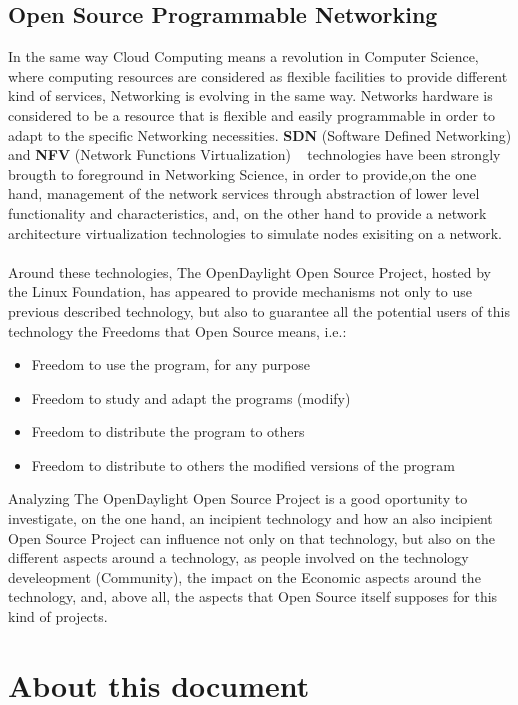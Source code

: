 \documentclass[a4paper, 12pt]{book}
\begin{document}
\subsection{Open Source Programmable Networking}
\label{subsec:freesoftware}
In the same way Cloud Computing means a revolution in Computer Science, where computing resources are considered as flexible facilities to provide different kind of services, Networking is evolving in the same way. Networks hardware is considered to be a resource that is flexible and easily programmable in order to adapt to the specific Networking necessities. \textbf{SDN} (Software Defined Networking) and \textbf{NFV} (Network Functions Virtualization) ~\cite{SDN} technologies have been strongly brougth to foreground in Networking Science, in order to provide,on the one hand, management of the network services through abstraction of lower level functionality and characteristics, and, on the other hand to provide a network architecture virtualization technologies to simulate nodes exisiting on a network.\\
\\
Around these technologies, The OpenDaylight Open Source Project, hosted by the Linux Foundation, has appeared to provide mechanisms not only to use previous described technology, but also to guarantee all the potential users of this technology the Freedoms that Open Source means, i.e.:
\begin{itemize}
 \item Freedom to use the program, for any purpose
 \item Freedom to study and adapt the programs (modify)
 \item Freedom to distribute the program to others
 \item Freedom to distribute to others the modified versions of the program
\end{itemize}
Analyzing The OpenDaylight Open Source Project is a good oportunity to investigate, on the one hand, an incipient technology and how an also incipient Open Source Project can influence not only on that technology, but also on the different aspects around a technology, as people involved on the technology develeopment (Community), the impact on the Economic aspects around the technology, and, above all, the aspects that Open Source itself supposes for this kind of projects.

\section{About this document}
\label{sec:about}
\end{document}

